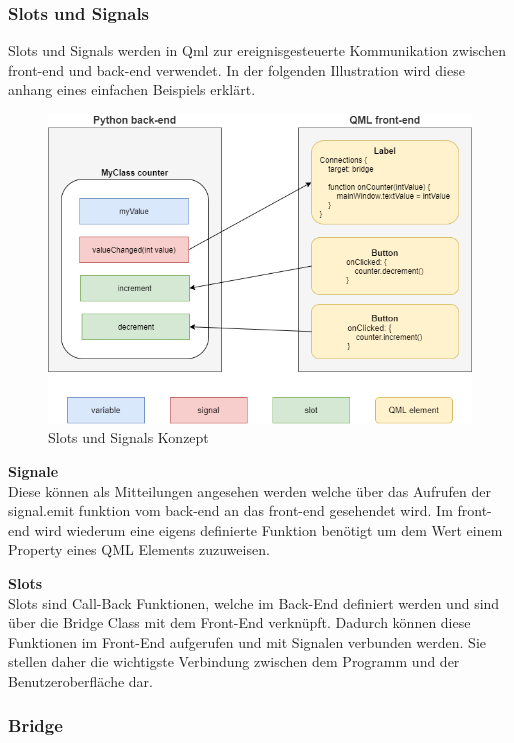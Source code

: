 \subsubsection{Slots und Signals} \label{sec:slots}
Slots und Signals werden in Qml zur ereignisgesteuerte Kommunikation zwischen front-end und back-end verwendet. In der folgenden Illustration wird diese anhang eines einfachen Beispiels erklärt.

\begin{figure}[H]
\begin{center}
\includegraphics[scale=0.4]{figures/hcis/signals_slots.png}
\caption{Slots und Signals Konzept}
\end{center}
\end{figure}

\textbf{Signale}\\ \medskip
Diese können als Mitteilungen angesehen werden welche über das Aufrufen der signal.emit funktion vom back-end an das front-end gesehendet wird. Im front-end wird wiederum eine eigens definierte Funktion benötigt um dem Wert einem Property eines QML Elements zuzuweisen.
\medskip

\textbf{Slots}\\ \medskip
Slots sind Call-Back Funktionen, welche im Back-End definiert werden und sind über die Bridge Class mit dem Front-End verknüpft. Dadurch können diese Funktionen im Front-End aufgerufen und mit Signalen verbunden werden. Sie stellen daher die wichtigste Verbindung zwischen dem Programm und der Benutzeroberfläche dar.

\newpage
	
\subsubsection{Bridge}


